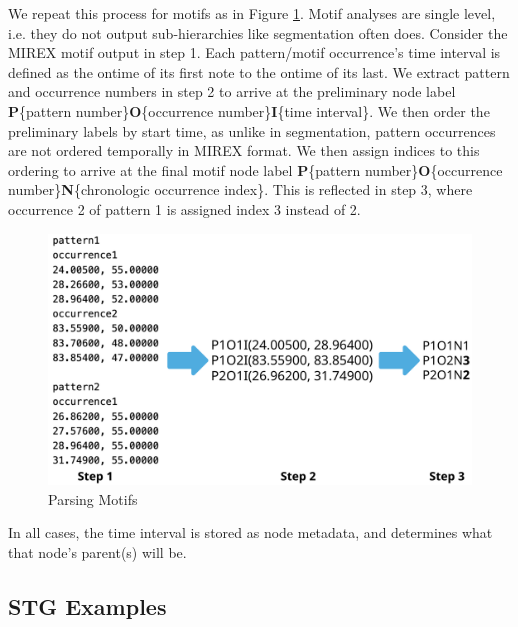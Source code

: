 \documentclass{article}
\begin{document}
We repeat this process for motifs as in Figure \ref{fig:motif_parse}. Motif analyses are single level, i.e. they do not output sub-hierarchies like segmentation often does. Consider the MIREX motif output in step 1. Each pattern/motif occurrence's time interval is defined as the ontime of its first note to the ontime of its last. We extract pattern and occurrence numbers in step 2 to arrive at the preliminary node label \textbf{P}\{pattern number\}\textbf{O}\{occurrence number\}\textbf{I}\{time interval\}. We then order the preliminary labels by start time, as unlike in segmentation, pattern occurrences are not ordered temporally in MIREX format. We then assign indices to this ordering to arrive at the final motif node label \textbf{P}\{pattern number\}\textbf{O}\{occurrence number\}\textbf{N}\{chronologic occurrence index\}. This is reflected in step 3, where occurrence 2 of pattern 1 is assigned index 3 instead of 2. 
\begin{figure}[h!]
  \centering
  \includegraphics[width=\linewidth]{figs/motif_parse}
  \caption{Parsing Motifs}
  \label{fig:motif_parse}
\end{figure}

In all cases, the time interval is stored as node metadata, and determines what that node's parent(s) will be.

\subsection{STG Examples}\label{subsec:stg_ex}
\end{document}
